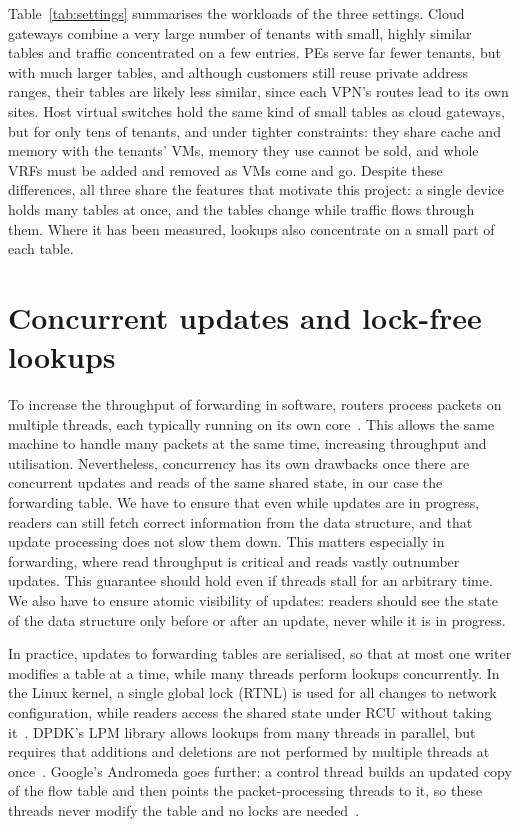 \documentclass[11pt,a4paper,oneside]{report}
\begin{document}
Table~\ref{tab:settings} summarises the workloads of the three settings. Cloud
gateways combine a very large number of tenants with small, highly similar
tables and traffic concentrated on a few entries. PEs serve far fewer tenants,
but with much larger tables, and although customers still reuse private address
ranges, their tables are likely less similar, since each VPN's routes lead to
its own sites. Host virtual switches hold the same kind of small tables as cloud
gateways, but for only tens of tenants, and under tighter constraints: they
share cache and memory with the tenants' VMs, memory they use cannot be sold,
and whole VRFs must be added and removed as VMs come and go. Despite these
differences, all three share the features that motivate this project: a single
device holds many tables at once, and the tables change while traffic flows
through them. Where it has been measured, lookups also concentrate on a small
part of each table.

\section{Concurrent updates and lock-free lookups}
\label{sec:concurrency}

To increase the throughput of forwarding in software, routers process packets on
multiple threads, each typically running on its own core~\cite{vppthreads}. This
allows the same machine to handle many packets at the same time, increasing
throughput and utilisation. Nevertheless, concurrency has its own drawbacks once
there are concurrent updates and reads of the same shared state, in our case the
forwarding table. We have to ensure that even while updates are in progress,
readers can still fetch correct information from the data structure, and that
update processing does not slow them down. This matters especially in
forwarding, where read throughput is critical and reads vastly outnumber
updates. This guarantee should hold even if threads stall for an arbitrary
time. We also have to ensure atomic visibility of updates: readers should see
the state of the data structure only before or after an update, never while it
is in progress.

In practice, updates to forwarding tables are serialised, so that at most one
writer modifies a table at a time, while many threads perform lookups
concurrently. In the Linux kernel, a single global lock (RTNL) is used for all
changes to network configuration, while readers access the shared state under
RCU without taking it~\cite{rtnetlink}. DPDK's LPM library allows lookups from
many threads in parallel, but requires that additions and deletions are not
performed by multiple threads at once~\cite{dpdkthreads}. Google's Andromeda
goes further: a control thread builds an updated copy of the flow table and
then points the packet-processing threads to it, so these threads never modify
the table and no locks are needed~\cite{dalton2018andromeda}.
\end{document}
